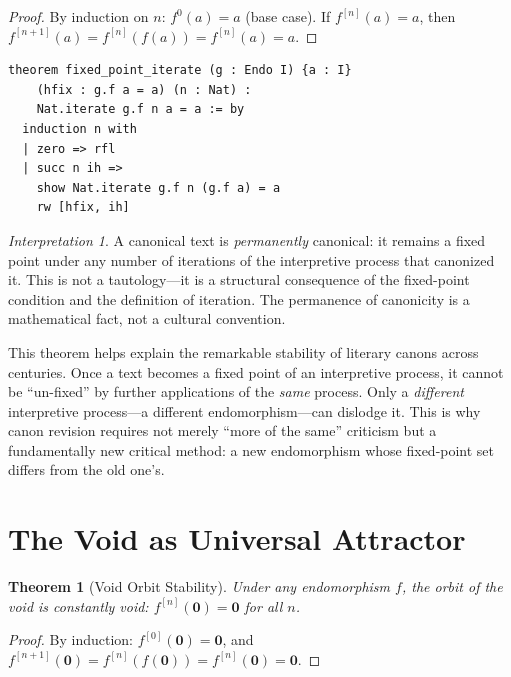 \documentclass[11pt,openany]{book}
\theoremstyle{definition}
\theoremstyle{plain}
\newtheorem{theorem}[axiom]{Theorem}
\theoremstyle{remark}
\newtheorem{interpretation}[axiom]{Interpretation}
\newcommand{\void}{\mathbf{0}}              %
\begin{document}
\begin{proof}
By induction on $n$: $f^0(a) = a$ (base case). If $f^{[n]}(a) = a$, then $f^{[n+1]}(a) = f^{[n]}(f(a)) = f^{[n]}(a) = a$.
\end{proof}

\begin{lstlisting}[language=Lean4]
theorem fixed_point_iterate (g : Endo I) {a : I}
    (hfix : g.f a = a) (n : Nat) :
    Nat.iterate g.f n a = a := by
  induction n with
  | zero => rfl
  | succ n ih =>
    show Nat.iterate g.f n (g.f a) = a
    rw [hfix, ih]
\end{lstlisting}

\begin{interpretation}
A canonical text is \emph{permanently} canonical: it remains a fixed point under any number of iterations of the interpretive process that canonized it. This is not a tautology---it is a structural consequence of the fixed-point condition and the definition of iteration. The permanence of canonicity is a mathematical fact, not a cultural convention.

This theorem helps explain the remarkable stability of literary canons across centuries. Once a text becomes a fixed point of an interpretive process, it cannot be ``un-fixed'' by further applications of the \emph{same} process. Only a \emph{different} interpretive process---a different endomorphism---can dislodge it. This is why canon revision requires not merely ``more of the same'' criticism but a fundamentally new critical method: a new endomorphism whose fixed-point set differs from the old one's.
\end{interpretation}

\section{The Void as Universal Attractor}

\begin{theorem}[Void Orbit Stability]
Under any endomorphism $f$, the orbit of the void is constantly void: $f^{[n]}(\void) = \void$ for all $n$.
\end{theorem}

\begin{proof}
By induction: $f^{[0]}(\void) = \void$, and $f^{[n+1]}(\void) = f^{[n]}(f(\void)) = f^{[n]}(\void) = \void$.
\end{proof}
\end{document}
